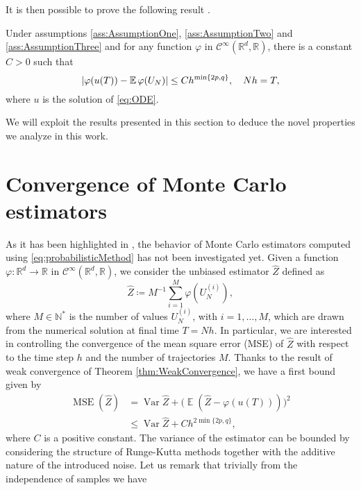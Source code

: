 \documentclass{siamart1116}
\numberwithin{theorem}{section}
\DeclarePairedDelimiter{\abs}{\lvert}{\rvert}
\renewcommand{\phi}{\varphi}
\newcommand{\N}{\mathbb{N}}
\newcommand{\R}{\mathbb{R}}
\newcommand{\defeq}{\coloneqq}
\newcommand{\Var}{\operatorname{Var}}
\newcommand{\E}{\operatorname{\mathbb{E}}}
\newcommand{\MSE}{\operatorname{MSE}}
\newcommand{\sksum}{\textstyle\sum}
\begin{document}
It is then possible to prove the following result \cite{CGS16}.
\begin{theorem}\label{thm:WeakConvergence} Under assumptions \ref{ass:AssumptionOne}, \ref{ass:AssumptionTwo} and \ref{ass:AssumptionThree} and for any function $\phi$ in $\mathcal{C}^\infty(\R^d, \R)$, there is a constant $C > 0$ such that
\begin{equation}
	\abs{\phi(u(T)) - \E\phi(U_N)} \leq Ch^{\min\{2p, q\}}, \quad Nh = T,
\end{equation}
	where $u$ is the solution of \eqref{eq:ODE}.
\end{theorem}

We will exploit the results presented in this section to deduce the novel properties we analyze in this work.

\section{Convergence of Monte Carlo estimators}\label{sect:MonteCarlo}
As it has been highlighted in \cite{KeH16}, the behavior of Monte Carlo estimators computed using \eqref{eq:probabilisticMethod} has not been investigated yet. Given a function $\phi\colon\R^d\to\R$ in $\mathcal{C}^\infty(\R^d, \R)$, we consider the unbiased estimator $\hat Z$ defined as
\begin{equation}
	\hat Z \defeq M^{-1} \sksum_{i = 1}^M \phi(U_N^{(i)}),
\end{equation}
where $M\in\N^*$ is the number of values $U^{(i)}_N$, with $i = 1, \ldots, M$, which are drawn from the numerical solution at final time $T = Nh$. In particular, we are interested in controlling the convergence of the mean square error (MSE) of $\hat Z$ with respect to the time step $h$ and the number of trajectories $M$. Thanks to the result of weak convergence of Theorem \ref{thm:WeakConvergence}, we have a first bound given by
\begin{equation}\label{eq:MSEdefinition}
\begin{aligned}
	 \MSE(\hat Z) &= \Var\hat Z + \big(\E(\hat Z - \phi(u(T)))\big)^2\\
	  &\leq \Var\hat Z + C h^{2\min\{2p, q\}},
\end{aligned}
\end{equation}
where $C$ is a positive constant. The variance of the estimator can be bounded by considering the structure of Runge-Kutta methods together with the additive nature of the introduced noise. Let us remark that trivially from the independence of samples we have
\end{document}
